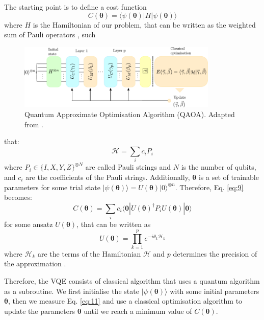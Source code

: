 \documentclass[prx,twocolumn,floatfix,superscriptaddress,longbibliography]{revtex4-1}
\begin{document}
The starting point is to define a cost function
\begin{equation}
  \label{eq:9}
  C(\boldsymbol{\theta}) =\langle\psi(\boldsymbol{\theta})|H|\psi(\boldsymbol{\theta})\rangle
\end{equation}
where $H$ is the Hamiltonian of our problem, that can be written as the weighted sum of Pauli operators \cite{Tilly2022}, such
\begin{figure}[ht!]
  \begin{center} 
  \includegraphics[width=0.85\textwidth]{QAOA-Blekos.pdf}
  \caption{\label{fig:qaoa} Quantum Approximate Optimisation Algorithm (QAOA). Adapted from \cite{Blekos2024}.}
  \end{center}
\end{figure}
that: 
\begin{equation}
  \label{eq:10}
  \mathcal{H} = \sum_{i} c_i P_i
\end{equation}
where $P_i \in \{I, X, Y, Z\}^{\otimes N}$ are called Pauli strings and $N$ is the number of qubits, and $c_i$ are the coefficients of the Pauli strings.  Additionally, $\boldsymbol{\theta}$ is a set of trainable parameters for some trial state $|\psi(\boldsymbol{\theta})\rangle = U(\boldsymbol{\theta}) |0\rangle ^{\otimes n}$. Therefore, Eq. \ref{eq:9} becomes:
\begin{equation}
  \label{eq:11}
  C(\boldsymbol{\theta}) =\sum_i c_i \langle \boldsymbol{0}|U(\boldsymbol{\theta})^\dagger P_i U(\boldsymbol{\theta})|\boldsymbol{0}\rangle
\end{equation}
for some ansatz $U(\boldsymbol{\theta})$, that can be written as
\begin{equation}
  \label{eq:12}
  U(\boldsymbol{\theta}) = \prod_{k=1}^{p} e^{-i\theta_k \mathcal{H}_k}
\end{equation}
where $\mathcal{H}_k$ are the terms of the Hamiltonian $\mathcal{H}$  and $p$ determines the precision of the approximation \cite{Cerezo2021}.

Therefore, the VQE consists of classical algorithm that uses a quantum algorithm as a subroutine. We first initialise the state 
$|\psi(\boldsymbol{\theta})\rangle$ with some initial parameters $\boldsymbol{\theta}$, then we measure Eq. \ref{eq:11} and use a classical optimisation algorithm to update 
the parameters $\boldsymbol{\theta}$ until we reach a minimum value of $C(\boldsymbol{\theta})$.
\end{document}
